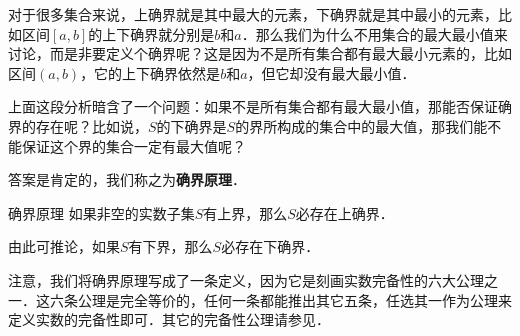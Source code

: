 对于很多集合来说，上确界就是其中最大的元素，下确界就是其中最小的元素，比如区间$[a, b]$的上下确界就分别是$b$和$a$．那么我们为什么不用集合的最大最小值来讨论，而是非要定义个确界呢？这是因为不是所有集合都有最大最小元素的，比如区间$(a, b)$，它的上下确界依然是$b$和$a$，但它却没有最大最小值．

上面这段分析暗含了一个问题：如果不是所有集合都有最大最小值，那能否保证确界的存在呢？比如说，$S$的下确界是$S$的界所构成的集合中的最大值，那我们能不能保证这个界的集合一定有最大值呢？

答案是肯定的，我们称之为\textbf{确界原理}．

\begin{definition}{确界原理}
如果非空的实数子集$S$有上界，那么$S$必存在上确界．

由此可推论，如果$S$有下界，那么$S$必存在下确界．
\end{definition}

注意，我们将确界原理写成了一条定义，因为它是刻画实数完备性的六大公理之一．这六条公理是完全等价的，任何一条都能推出其它五条，任选其一作为公理来定义实数的完备性即可．其它的完备性公理请参见．

























